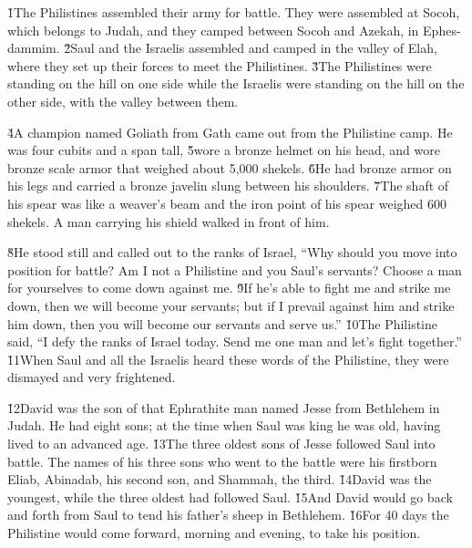 \v{1}The Philistines assembled their army for battle. They were assembled at Socoh, which belongs to Judah, and they camped between Socoh and Azekah, in Ephes-dammim. \v{2}Saul and the Israelis assembled and camped in the valley of Elah, where they set up their forces to meet the Philistines. \v{3}The Philistines were standing on the hill on one side while the Israelis were standing on the hill on the other side, with the valley between them.

\v{4}A champion named Goliath from Gath came out from the Philistine camp. He was four cubits and a span tall, \v{5}wore a bronze helmet on his head, and wore bronze scale armor that weighed about 5,000 shekels. \v{6}He had bronze armor on his legs and carried a bronze javelin slung between his shoulders. \v{7}The shaft of his spear was like a weaver's beam and the iron point of his spear weighed 600 shekels. A man carrying his shield walked in front of him.

\v{8}He stood still and called out to the ranks of Israel, ``Why should you move into position for battle? Am I not a Philistine and you Saul's servants? Choose a man for yourselves to come down against me. \v{9}If he's able to fight me and strike me down, then we will become your servants; but if I prevail against him and strike him down, then you will become our servants and serve us.'' \v{10}The Philistine said, ``I defy the ranks of Israel today. Send me one man and let's fight together.'' \v{11}When Saul and all the Israelis heard these words of the Philistine, they were dismayed and very frightened.

\v{12}David was the son of that Ephrathite man named Jesse from Bethlehem in Judah. He had eight sons; at the time when Saul was king he was old, having lived to an advanced age. \v{13}The three oldest sons of Jesse followed Saul into battle. The names of his three sons who went to the battle were his firstborn Eliab, Abinadab, his second son, and Shammah, the third. \v{14}David was the youngest, while the three oldest had followed Saul. \v{15}And David would go back and forth from Saul to tend his father's sheep in Bethlehem. \v{16}For 40 days the Philistine would come forward, morning and evening, to take his position.

